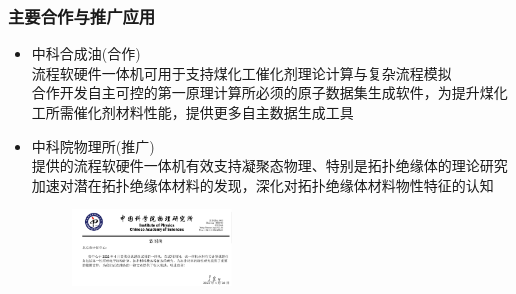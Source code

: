 \begin{frame}
	\frametitle{主要合作与推广应用}
	\begin{itemize}
	 \setlength{\itemsep}{10pt}
		\item 中科合成油(合作)\\
		流程软硬件一体机可用于支持煤化工催化剂理论计算与复杂流程模拟\\
		合作开发自主可控的第一原理计算所必须的原子数据集生成软件，为提升煤化工所需催化剂材料性能，提供更多自主数据生成工具
		\item 中科院物理所(推广)\\
		提供的流程软硬件一体机有效支持凝聚态物理、特别是拓扑绝缘体的理论研究\\
		加速对潜在拓扑绝缘体材料的发现，深化对拓扑绝缘体材料物性特征的认知
\begin{figure}[h!]
\centering
\vskip -5pt
\includegraphics[height=0.8in]{Figures/Acknowledge-IP_CAS-BCC.png}
\label{Acknowleges-IP_CAS}
\end{figure}
	\end{itemize}
\end{frame}


